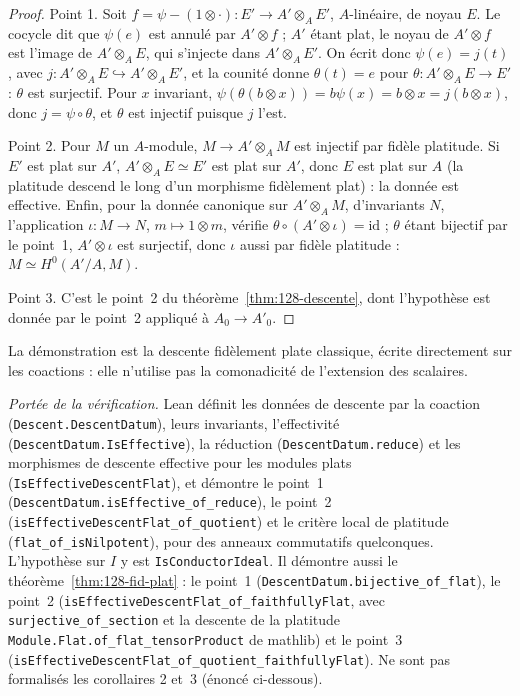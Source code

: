 \begin{proof}
Point 1. Soit $f = \psi - (1 \otimes \cdot) : E' \to A' \otimes_A E'$, $A$-linéaire, de noyau $E$. Le cocycle dit que $\psi(e)$ est annulé par $A' \otimes f$ ; $A'$ étant plat, le noyau de $A' \otimes f$ est l'image de $A' \otimes_A E$, qui s'injecte dans $A' \otimes_A E'$. On écrit donc $\psi(e) = j(t)$, avec $j : A' \otimes_A E \hookrightarrow A' \otimes_A E'$, et la counité donne $\theta(t) = e$ pour $\theta : A' \otimes_A E \to E'$ : $\theta$ est surjectif. Pour $x$ invariant, $\psi(\theta(b \otimes x)) = b \psi(x) = b \otimes x = j(b \otimes x)$, donc $j = \psi \circ \theta$, et $\theta$ est injectif puisque $j$ l'est.

Point 2. Pour $M$ un $A$-module, $M \to A' \otimes_A M$ est injectif par fidèle platitude. Si $E'$ est plat sur $A'$, $A' \otimes_A E \simeq E'$ est plat sur $A'$, donc $E$ est plat sur $A$ (la platitude descend le long d'un morphisme fidèlement plat) : la donnée est effective. Enfin, pour la donnée canonique sur $A' \otimes_A M$, d'invariants $N$, l'application $\iota : M \to N$, $m \mapsto 1 \otimes m$, vérifie $\theta \circ (A' \otimes \iota) = \mathrm{id}$ ; $\theta$ étant bijectif par le point~1, $A' \otimes \iota$ est surjectif, donc $\iota$ aussi par fidèle platitude : $M \simeq H^0(A'/A, M)$.

Point 3. C'est le point~2 du théorème~\ref{thm:128-descente}, dont l'hypothèse est donnée par le point~2 appliqué à $A_0 \to A'_0$.
\end{proof}

La démonstration est la descente fidèlement plate classique, écrite directement sur les coactions : elle n'utilise pas la comonadicité de l'extension des scalaires.

\begingroup\raggedright
\noindent\emph{Portée de la vérification.} Lean définit les données de descente par la coaction (\texttt{Descent.\allowbreak{}DescentDatum}), leurs invariants, l'effectivité (\texttt{DescentDatum.\allowbreak{}IsEffective}), la réduction (\texttt{DescentDatum.\allowbreak{}reduce}) et les morphismes de descente effective pour les modules plats (\texttt{IsEffectiveDescentFlat}), et démontre le point~1 (\texttt{DescentDatum.\allowbreak{}isEffective\_of\_reduce}), le point~2 (\texttt{isEffectiveDescentFlat\_of\_quotient}) et le critère local de platitude (\texttt{flat\_of\_isNilpotent}), pour des anneaux commutatifs quelconques. L'hypothèse sur $I$ y est \texttt{IsConductorIdeal}. Il démontre aussi le théorème~\ref{thm:128-fid-plat} : le point~1 (\texttt{DescentDatum.\allowbreak{}bijective\_of\_flat}), le point~2 (\texttt{isEffectiveDescentFlat\_of\_faithfullyFlat}, avec \texttt{surjective\_of\_section} et la descente de la platitude \texttt{Module.\allowbreak{}Flat.\allowbreak{}of\_flat\_tensorProduct} de mathlib) et le point~3 (\texttt{isEffectiveDescentFlat\_of\_quotient\_faithfullyFlat}). Ne sont pas formalisés les corollaires 2 et~3 (énoncé ci-dessous).\par\endgroup

